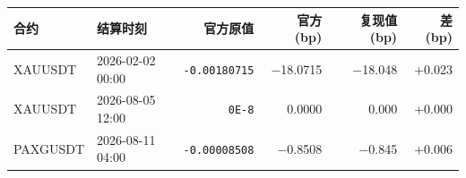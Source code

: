 \begin{tabular}{llrrrr}
\toprule
合约 & 结算时刻 & 官方原值 & 官方 (bp) & 复现值 (bp) & 差 (bp) \\
\midrule
XAUUSDT & 2026-02-02 00:00 & \texttt{-0.00180715} & −18.0715 & −18.048 & +0.023 \\
XAUUSDT & 2026-08-05 12:00 & \texttt{0E-8} & 0.0000 & 0.000 & +0.000 \\
PAXGUSDT & 2026-08-11 04:00 & \texttt{-0.00008508} & −0.8508 & −0.845 & +0.006 \\
\bottomrule
\end{tabular}
